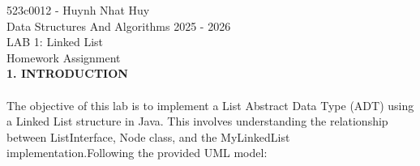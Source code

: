 \documentclass[12pt]{article}
\begin{document}
{\raggedleft{} 523c0012 - Huynh Nhat Huy \\   Data Structures And Algorithms 2025 - 2026  \\  LAB 1: Linked List \\ Homework Assignment \\}
\vspace{20pt}
\textbf{1. INTRODUCTION}\\\\
The objective of this lab is to implement a List Abstract Data Type (ADT) using a Linked List structure in Java. This involves understanding the relationship between ListInterface, Node class, and the MyLinkedList implementation.Following the provided UML model:
\\
\usetikzlibrary{arrows.meta, shapes.multipart, positioning}
\end{document}
